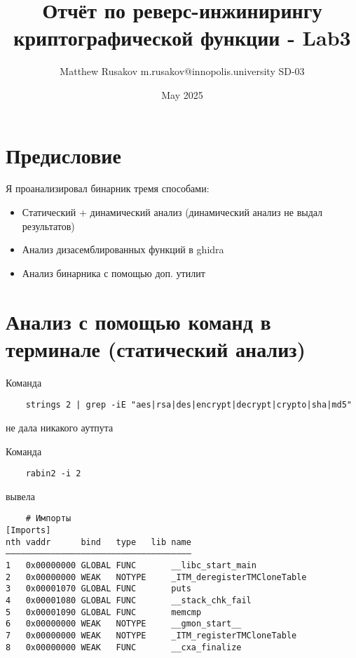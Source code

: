 \usepackage[utf8]{inputenc}
\usepackage{geometry}
\usepackage[T1]{fontenc}
\usepackage[russian]{babel}
\usepackage{amsmath}

\title{Отчёт по реверс-инжинирингу криптографической функции - Lab3}
\author{Matthew Rusakov m.rusakov@innopolis.university SD-03}
\date{May 2025}




    \maketitle

    \section*{Предисловие}

    Я проанализировал бинарник тремя способами:
    \begin{itemize}
        \item Статический + динамический анализ (динамический анализ не выдал результатов)
        \item Анализ дизасемблированных функций в ghidra
        \item Анализ бинарника с помощью доп. утилит
    \end{itemize}


    \section{Анализ с помощью команд в терминале (статический анализ)}

    Команда
    \begin{verbatim}
    strings 2 | grep -iE "aes|rsa|des|encrypt|decrypt|crypto|sha|md5"
    \end{verbatim}
    не дала никакого аутпута

    Команда
    \begin{verbatim}
    rabin2 -i 2
    \end{verbatim}
    вывела
    \begin{verbatim}
    # Импорты
[Imports]
nth vaddr      bind   type   lib name
―――――――――――――――――――――――――――――――――――――
1   0x00000000 GLOBAL FUNC       __libc_start_main
2   0x00000000 WEAK   NOTYPE     _ITM_deregisterTMCloneTable
3   0x00001070 GLOBAL FUNC       puts
4   0x00001080 GLOBAL FUNC       __stack_chk_fail
5   0x00001090 GLOBAL FUNC       memcmp
6   0x00000000 WEAK   NOTYPE     __gmon_start__
7   0x00000000 WEAK   NOTYPE     _ITM_registerTMCloneTable
8   0x00000000 WEAK   FUNC       __cxa_finalize
    \end{verbatim}

